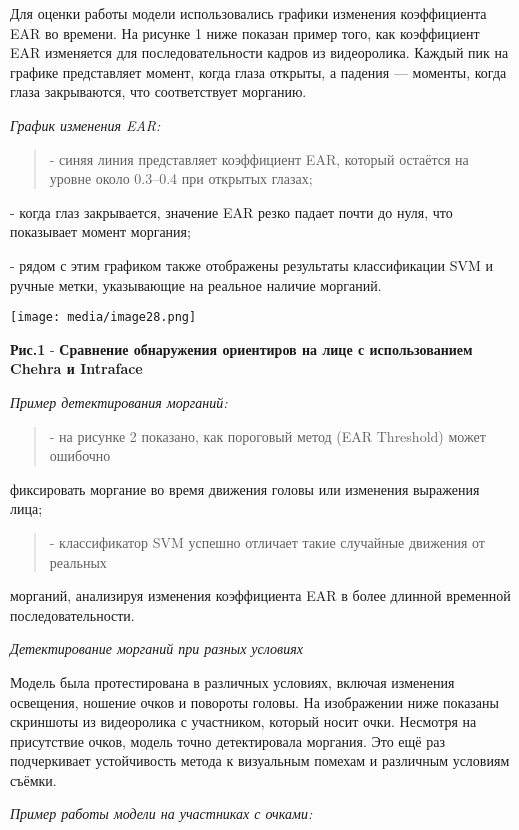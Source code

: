 \documentclass[
]{article}
\begin{document}
Для оценки работы модели использовались графики изменения коэффициента
EAR во времени. На рисунке 1 ниже показан пример того, как коэффициент
EAR изменяется для последовательности кадров из видеоролика. Каждый пик
на графике представляет момент, когда глаза открыты, а падения ---
моменты, когда глаза закрываются, что соответствует морганию.

\emph{График изменения EAR:}

\begin{quote}
- синяя линия представляет коэффициент EAR, который остаётся на уровне
около 0.3--0.4 при открытых глазах;
\end{quote}

- когда глаз закрывается, значение EAR резко падает почти до нуля, что
показывает момент моргания;

- рядом с этим графиком также отображены результаты классификации SVM и
ручные метки, указывающие на реальное наличие морганий.

\texttt{[image: media/image28.png]}

\textbf{Рис.1} - \textbf{Сравнение обнаружения ориентиров на лице с
использованием Chehra и Intraface}

\emph{Пример детектирования морганий:}

\begin{quote}
- на рисунке 2 показано, как пороговый метод (EAR Threshold) может
ошибочно
\end{quote}

фиксировать моргание во время движения головы или изменения выражения
лица;

\begin{quote}
- классификатор SVM успешно отличает такие случайные движения от
реальных
\end{quote}

морганий, анализируя изменения коэффициента EAR в более длинной
временной последовательности.

\emph{Детектирование морганий при разных условиях}

Модель была протестирована в различных условиях, включая изменения
освещения, ношение очков и повороты головы. На изображении ниже показаны
скриншоты из видеоролика с участником, который носит очки. Несмотря на
присутствие очков, модель точно детектировала моргания. Это ещё раз
подчеркивает устойчивость метода к визуальным помехам и различным
условиям съёмки.

\emph{Пример работы модели на участниках с очками:}
\end{document}
